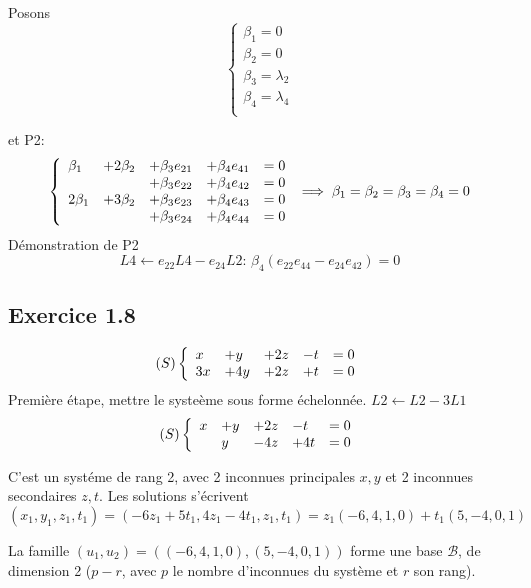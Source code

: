 \documentclass[]{book}
\theoremstyle{definition}
\begin{document}
Posons
$$
\left\{ 
\begin{array}{l}
   \beta_1 = 0 \\
   \beta_2 = 0 \\
   \beta_3 = \lambda_2 \\
   \beta_4 = \lambda_4 \\
\end{array}
\right. 
$$


et P2:
$$
\left\{ 
\begin{array}{l l l l l}
  \beta_1  & +2\beta_2 & +\beta_3 e_{21} & +\beta_4 e_{41} & = 0 \\
           &           & +\beta_3 e_{22} & +\beta_4 e_{42} & = 0 \\
  2\beta_1 & +3\beta_2 & +\beta_3 e_{23} & +\beta_4 e_{43} & = 0 \\
             &             & +\beta_3 e_{24} & +\beta_4 e_{44} & = 0 \\
\end{array}
\right. 
\implies
\beta_1=\beta_2=\beta_3=\beta_4=0
$$
D\'emonstration de P2\\


$$L4 \leftarrow e_{22}L4-e_{24}L2:\,  \beta_4 (e_{22}e_{44}-e_{24}e_{42}) = 0$$

\subsection*{Exercice 1.8}
$$(S)
\left\{ 
\begin{array}{l l l l l}
  x  & +y  & +2z & -t & = 0 \\
  3x & +4y & +2z & +t & = 0 \\
\end{array}
\right. 
$$
Premi\`ere \'etape, mettre le syste\`eme sous forme \'echelonn\'ee. $L2 \leftarrow L2 - 3L1$
$$(S)
\left\{ 
\begin{array}{l l l l l}
  x  & +y & +2z & -t  & = 0 \\
     &  y & -4z & +4t & = 0 \\
\end{array}
\right. 
$$

C'est un syst\'eme de rang 2, avec 2 inconnues principales $x, y$ et 2 inconnues secondaires $z, t$. Les solutions s'\'ecrivent
$$(x_1, y_1, z_1, t_1) = (-6z_1+5t_1, 4z_1-4t_1, z_1, t_1) = z_1(-6,4,1,0)+t_1(5,-4,0,1)$$

La famille $(u_1, u_2) = ((-6,4,1,0),(5,-4,0,1))$ forme une base $\mathcal{B}$, de dimension 2 ($p-r$, avec $p$ le nombre d'inconnues du syst\`eme et $r$ son rang).\\
\end{document}
